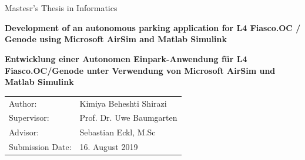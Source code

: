 \begin{titlepage}
  \centering


  \vspace{5mm}
  {\huge\MakeUppercase{\getFaculty{}}}\\

  \vspace{5mm}
  {\large\MakeUppercase{\getUniversity{}}}\\

  \vspace{20mm}
  {\Large Mastesr's Thesis in Informatics}

  \makeatletter
  \vspace{15mm}
  {
  {\huge\bfseries Development of an autonomous parking application for L4 Fiasco.OC / Genode using Microsoft AirSim and Matlab Simulink}

  \vspace{10mm}
  {\huge\bfseries \foreignlanguage{ngerman}Entwicklung einer Autonomen Einpark-Anwendung für L4 Fiasco.OC/Genode unter Verwendung von Microsoft AirSim und Matlab Simulink}
  }
  {
  {\huge\bfseries \getTitleGer{}}

  \vspace{10mm}
  {\huge\bfseries \foreignlanguage{english}{\getTitle{}}}
  }
  \makeatother

  \vspace{15mm}
  \begin{tabular}{l l}
    Author:          & Kimiya Beheshti Shirazi \\
    Supervisor:      & Prof. Dr. Uwe Baumgarten \\
    Advisor:         & Sebastian Eckl, M.Sc \\
    Submission Date: & 16. August 2019 \\
  \end{tabular}

\end{titlepage}
